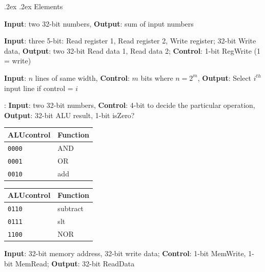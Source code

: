 \documentclass[10pt,landscape,a4paper]{article}
\makeatletter
\newenvironment{descitemize} %
{\begin{description}[leftmargin=*,before=\let\makelabel\descitemlabel]}
{\end{description}}
\newcommand{\descitemlabel}[1]{%
\textbullet\ \textbf{#1}%
}
\renewcommand{\subsection}{\@startsection{subsection}{1}{0mm}%
                                {.2ex}%
                                {.2ex}%
                                {\sffamily\bfseries}}
\makeatother
\begin{document}
\begin{multicols*}{3}
  \subsection{Elements}
  \begin{descitemize}
    \item [Adder] \textbf{Input}: two 32-bit numbers, \textbf{Output}: sum of input numbers
    \item [Register File] \textbf{Input}: three 5-bit: Read register 1, Read register 2, Write register; 32-bit Write data, \textbf{Output}: two 32-bit Read data 1, Read data 2; \textbf{Control}: 1-bit RegWrite (1 = write)
    \item [Multiplexer] \textbf{Input}: $n$ lines of same width, \textbf{Control}: $m$ bits where $n=2^m$, \textbf{Output}: Select $i^{th}$ input line if control = $i$
    \item [Arithmetic Logic Unit]: \textbf{Input}: two 32-bit numbers, \textbf{Control}: 4-bit to decide the particular operation, \textbf{Output}: 32-bit ALU result, 1-bit isZero? \\
    \begin{tabular}{|l|l|}
      \hline
      \textbf{ALUcontrol} & \textbf{Function} \\ \hline
      \texttt{0000}       & AND               \\
      \texttt{0001}       & OR                \\
      \texttt{0010}       & add               \\
      \hline
    \end{tabular}
    \begin{tabular}{|l|l|}
      \hline
      \textbf{ALUcontrol} & \textbf{Function} \\ \hline
      \texttt{0110}       & subtract          \\
      \texttt{0111}       & slt               \\
      \texttt{1100}       & NOR               \\
      \hline
    \end{tabular}
    \item [Data Memory] \textbf{Input}: 32-bit memory address, 32-bit write data; \textbf{Control}: 1-bit MemWrite, 1-bit MemRead; \textbf{Output}: 32-bit ReadData
    \\
  \end{descitemize}


\end{multicols*}
\end{document}
